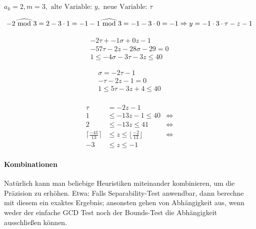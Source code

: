 \( a_k = 2, m=3, \text{ alte Variable: } y, \text{ neue Variable: } \tau \)

\[
-2 \widehat{\textrm{\ mod\ }} 3 = 2 - 3 \cdot 1 = -1 \\
-1 \widehat{\textrm{\ mod\ }} 3 = -1 -3 \cdot 0 = -1 \\
\Rightarrow y = -1 \cdot 3 \cdot \tau - z - 1
\]

\begin{align}
-2 \tau + -1 \sigma + 0 z - 1\\
-57 \tau - 2 z - 28 \sigma - 29 = 0 \\
1 \leq -4 \sigma - 3 \tau - 3 z \leq 40
\end{align}

\begin{align}
\sigma = -2 \tau - 1 \\
- \tau - 2z - 1 = 0 \\
1 \leq 5 \tau - 3 z + 4 \leq 40 \\
\end{align}

\begin{align}
 \tau & = -2z -1  & \\
1      & \leq -13z - 1  \leq 40 & \Leftrightarrow \\
2      & \leq -13z       \leq 41 & \Leftrightarrow \\
\lceil \frac{-41}{13} \rceil & \leq z  \leq \lfloor \frac{-2}{13} \rfloor & \Leftrightarrow \\
-3 & \leq z  \leq -1 &
\end{align}






\paragraph{Kombinationen}

Natürlich kann man beliebige Heuristiken miteinander kombinieren, um
die Präzision zu erhöhen. Etwa: Falls Separability-Test anwendbar,
dann berechne mit diesem ein exaktes Ergebnis; ansonsten gehen von
Abhängigkeit aus, wenn weder der einfache GCD Test noch der
Bounds-Test die Abhängigkeit ausschließen können.

